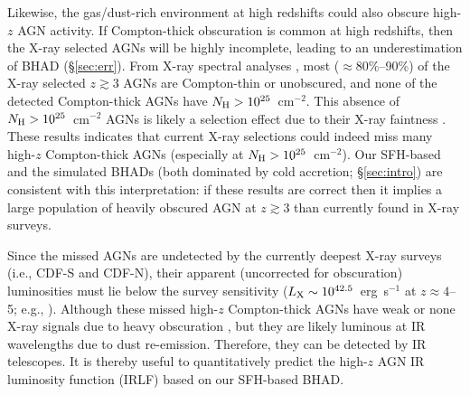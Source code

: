 \documentclass[twocolumn,twocolappendix,times]{aastex63}
\newcommand{\jwst}{{\it JWST\/}}
\newcommand{\lx}{L_{\rm X}}
\newcommand{\fst}[1]{#1}
\newcommand{\scd}[1]{#1}
\begin{document}
\begin{CJK*}{UTF8}{gbsn}
Likewise, the gas/dust-rich environment at high redshifts could also obscure high-$z$ AGN activity.  
If Compton-thick obscuration is common at high redshifts, then the X-ray selected AGNs will be highly incomplete, leading to an underestimation of BHAD (\S\ref{sec:err}).
From X-ray spectral analyses \citep[e.g.,][]{vito18, li19}, most ($\approx 80\%$--90\%) of the X-ray selected $z\gtrsim 3$ AGNs are Compton-thin or unobscured, and none of the detected Compton-thick AGNs have $N_{\rm H}>10^{25}$~cm$^{-2}$.
This absence of $N_{\rm H}>10^{25}$~cm$^{-2}$ AGNs is likely a selection effect due to their X-ray faintness \citep[e.g.,][]{hickox18}.
These results indicates that current X-ray selections could indeed miss many high-$z$ Compton-thick AGNs (especially at $N_{\rm H}>10^{25}$~cm$^{-2}$).
Our SFH-based and the simulated BHADs \fst{(both dominated by cold accretion; \S\ref{sec:intro})} are consistent with this interpretation: if these results are correct then it implies a large population of heavily obscured AGN at $z\gtrsim 3$ than currently found in X-ray surveys. 

\scd{Since the missed AGNs are undetected by the currently deepest X-ray surveys (i.e., CDF-S and CDF-N), their apparent (uncorrected for obscuration) luminosities must lie below the survey sensitivity ($\lx \sim 10^{42.5}$~erg~s$^{-1}$ at $z\approx 4$--5; e.g., \citealt{vito18}).}
\fst{Although these missed high-$z$ Compton-thick AGNs have weak or none X-ray signals due to heavy obscuration \cite[e.g.,][]{vito16}, but they are likely luminous at IR wavelengths due to dust re-emission.  
Therefore, they can be detected by IR telescopes. 
It is thereby useful to quantitatively predict the high-$z$ AGN IR luminosity function (IRLF) based on our SFH-based BHAD.}


\end{CJK*}
\end{document}
